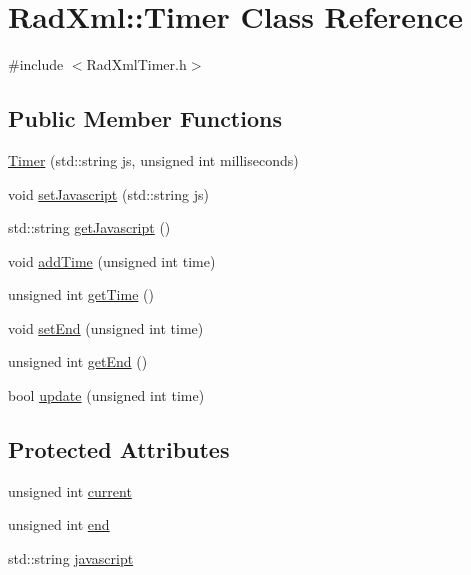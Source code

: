 \hypertarget{class_rad_xml_1_1_timer}{\section{Rad\-Xml\-:\-:Timer Class Reference}
\label{class_rad_xml_1_1_timer}
}


{\ttfamily \#include $<$Rad\-Xml\-Timer.\-h$>$}

\subsection*{Public Member Functions}
\begin{DoxyCompactItemize}
\item 
\hyperlink{class_rad_xml_1_1_timer_a61a378d1b1c3944121521404ff3cdc64}{Timer} (std\-::string js, unsigned int milliseconds)
\item 
void \hyperlink{class_rad_xml_1_1_timer_aaacfcecdebb20f6146f4122843d4ea7c}{set\-Javascript} (std\-::string js)
\item 
std\-::string \hyperlink{class_rad_xml_1_1_timer_addd19c408ef5489b627f977df4f54e3a}{get\-Javascript} ()
\item 
void \hyperlink{class_rad_xml_1_1_timer_a1e35d6d17a55437e9a5a265fe871f159}{add\-Time} (unsigned int time)
\item 
unsigned int \hyperlink{class_rad_xml_1_1_timer_a2ec6c827ebe9e4b3d738b97c7c1fca42}{get\-Time} ()
\item 
void \hyperlink{class_rad_xml_1_1_timer_ab9deae50c454fb9c9445725d13cbd088}{set\-End} (unsigned int time)
\item 
unsigned int \hyperlink{class_rad_xml_1_1_timer_af550b1ab78978488b50144622e20c0e1}{get\-End} ()
\item 
bool \hyperlink{class_rad_xml_1_1_timer_a47a2f448083d95e48a770a422857dc3f}{update} (unsigned int time)
\end{DoxyCompactItemize}
\subsection*{Protected Attributes}
\begin{DoxyCompactItemize}
\item 
unsigned int \hyperlink{class_rad_xml_1_1_timer_a902e643027564680c48b4f00f70fe4a5}{current}
\item 
unsigned int \hyperlink{class_rad_xml_1_1_timer_aeab13030e3212ed7bd713ad5c97db44a}{end}
\item 
std\-::string \hyperlink{class_rad_xml_1_1_timer_a238ff53c489a84c319c737b9dc12ce6a}{javascript}
\end{DoxyCompactItemize}


